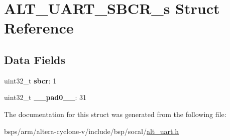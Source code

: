 \hypertarget{structALT__UART__SBCR__s}{}\section{A\+L\+T\+\_\+\+U\+A\+R\+T\+\_\+\+S\+B\+C\+R\+\_\+s Struct Reference}
\label{structALT__UART__SBCR__s}
\subsection*{Data Fields}
\begin{DoxyCompactItemize}
\item 
\mbox{\label{structALT__UART__SBCR__s_a976ce827fc817d11fa2b0d6b2d9f5929}} 
uint32\+\_\+t {\bfseries sbcr}\+: 1
\item 
\mbox{\label{structALT__UART__SBCR__s_a262b117ecd00822c4b77504b7ea57ca6}} 
uint32\+\_\+t {\bfseries \+\_\+\+\_\+pad0\+\_\+\+\_\+}\+: 31
\end{DoxyCompactItemize}


The documentation for this struct was generated from the following file\+:\begin{DoxyCompactItemize}
\item 
bsps/arm/altera-\/cyclone-\/v/include/bsp/socal/\mbox{\hyperlink{alt__uart_8h}{alt\+\_\+uart.\+h}}\end{DoxyCompactItemize}

